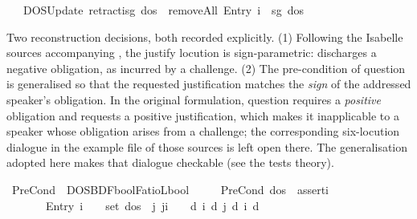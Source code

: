 \begin{isabellebody}
\ \ {\isacharbar}{\kern0pt}\ {\isachardoublequoteopen}DOSUpdate\ retract{\isacharbrackleft}{\kern0pt}i{\isacharcomma}{\kern0pt}{\isasymphi}{\isacharcomma}{\kern0pt}sg{\isacharbrackright}{\kern0pt}\ dos\ {\isacharequal}{\kern0pt}\ removeAll\ {\isacharparenleft}{\kern0pt}Entry\ i\ {\isasymphi}\ sg{\isacharparenright}{\kern0pt}\ dos{\isachardoublequoteclose}%
\isadelimdocument
%
\endisadelimdocument
%
\isatagdocument
%
\isamarkuptrue%
%
\endisatagdocument
{\isafolddocument}%
%
\isadelimdocument
%
\endisadelimdocument
%
\begin{isamarkuptext}%
Two reconstruction decisions, both recorded explicitly. (1) Following the
Isabelle sources accompanying \cite{PasettoBenzmueller2024}, the justify locution
is sign-parametric:  discharges a negative obligation, as incurred
by a challenge. (2) The pre-condition of question is generalised so that the
requested justification matches the \emph{sign} of the addressed speaker's obligation.
In the original formulation, question requires a \emph{positive} obligation and requests
a positive justification, which makes it inapplicable to a speaker whose
obligation arises from a challenge; the corresponding six-locution dialogue in the
example file of those sources is left open there. The generalisation adopted here
makes that dialogue checkable (see the tests theory).%
\end{isamarkuptext}\isamarkuptrue%
\isamarkupfalse%
\ PreCond\ {\isacharcolon}{\kern0pt}{\isacharcolon}{\kern0pt}\ {\isachardoublequoteopen}DOS{\isasymRightarrow}{\isacharparenleft}{\kern0pt}BDF{\isasymRightarrow}bool{\isacharparenright}{\kern0pt}{\isasymRightarrow}FatioL{\isasymRightarrow}bool{\isachardoublequoteclose}\ \isanewline
\ \ \ \ {\isachardoublequoteopen}PreCond\ dos\ {\isasymGamma}\ assert{\isacharbrackleft}{\kern0pt}i{\isacharcomma}{\kern0pt}{\isasymphi}{\isacharbrackright}{\kern0pt}\ {\isacharequal}{\kern0pt}\isanewline
\ \ \ \ \ \ \ {\isacharparenleft}{\kern0pt}{\isacharparenleft}{\kern0pt}Entry\ i\ {\isasymphi}\ {\isasymoplus}{\isacharparenright}{\kern0pt}\ {\isasymnotin}\ set\ dos\ {\isasymand}\ {\isacharparenleft}{\kern0pt}{\isasymforall}j{\isachardot}{\kern0pt}\ j{\isasymnoteq}i\ {\isasymlongrightarrow}\ {\isasymGamma}\ {\isasymTurnstile}\ {\isasymD}\isactrlsup d\ i\ {\isacharparenleft}{\kern0pt}{\isasymB}\isactrlsup d\ j\ {\isacharparenleft}{\kern0pt}{\isasymB}\isactrlsup d\ i\ {\isacharbraceleft}{\kern0pt}{\isasymphi}{\isacharbraceright}{\kern0pt}\isactrlsup d{\isacharparenright}{\kern0pt}{\isacharparenright}{\kern0pt}{\isacharparenright}{\kern0pt}{\isacharparenright}{\kern0pt}{\isachardoublequoteclose}\isanewline

\end{isabellebody}
